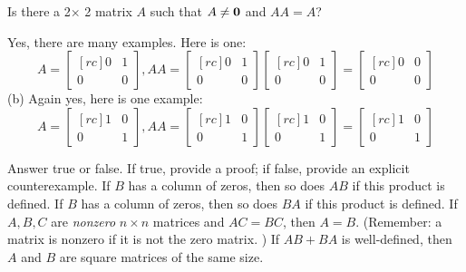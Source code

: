\ii Is there a 2$\times$ 2 matrix $A$ such that $A \neq {\mathbf 0}$ and $AA = A$?
\ee
\ \\
\begin{solution}
Yes, there are many examples. Here is one:
\[
A = 
\begin{bmatrix}[rc]
0&1\\
0&0
\end{bmatrix} ,
AA = 
\begin{bmatrix}[rc]
0&1\\
0&0
\end{bmatrix}
\begin{bmatrix}[rc]
0&1\\
0&0
\end{bmatrix}
= 
\begin{bmatrix}[rc]
0&0\\
0&0
\end{bmatrix}
\]
\noindent 
(b)
Again yes, here is one example:
\[
A = 
\begin{bmatrix}[rc]
1&0\\
0&1
\end{bmatrix} ,
AA = 
\begin{bmatrix}[rc]
1&0\\
0&1
\end{bmatrix}
\begin{bmatrix}[rc]
1&0\\
0&1
\end{bmatrix}
= 
\begin{bmatrix}[rc]
1&0\\
0&1
\end{bmatrix}
\]
\end{solution}

\ii Answer true or false. If true, provide a proof; if false, provide an explicit counterexample. 
\bb
\ii If $B$ has a column of zeros, then so does $AB$ if this product is defined.
\ii If $B$ has a column of zeros, then so does $BA$ if this product is defined.
\ii If $A, B, C$ are {\em nonzero}  $n\times n$ matrices and $AC=BC$, then $A=B$. (Remember: a matrix is nonzero if it is not the zero matrix. )
\ii If $AB+BA$ is well-defined, then $A$ and $B$ are square matrices of the same size. 

